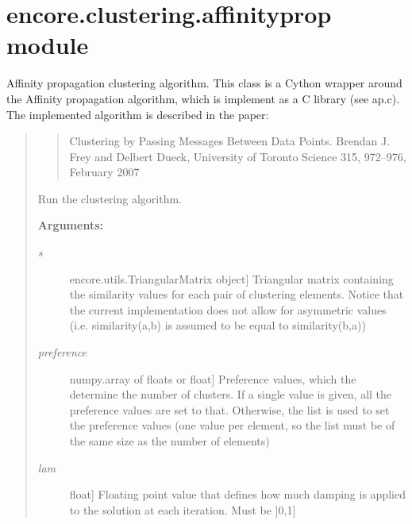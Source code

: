 \documentclass[letterpaper,10pt,english]{sphinxmanual}
\begin{document}
\section{encore.clustering.affinityprop module}
\label{index:encore-clustering-affinityprop-module}\label{index:module-encore.clustering.affinityprop}

\begin{fulllineitems}
Affinity propagation clustering algorithm. This class is a Cython wrapper around the Affinity propagation algorithm, which is implement as a C library (see ap.c). The implemented algorithm is described in the paper:
\begin{quote}
\begin{quote}

Clustering by Passing Messages Between Data Points.
Brendan J. Frey and Delbert Dueck, University of Toronto
Science 315, 972–976, February 2007
\end{quote}

\begin{fulllineitems}
\label{index:encore.clustering.affinityprop.run}
Run the clustering algorithm.

\textbf{Arguments:}
\begin{description}
\item[{\emph{s}}] \leavevmode{[}encore.utils.TriangularMatrix object{]}
Triangular matrix containing the similarity values for each pair of clustering elements. Notice that the current implementation does not allow for asymmetric values (i.e. similarity(a,b) is assumed to be equal to similarity(b,a))

\item[{\emph{preference}}] \leavevmode{[}numpy.array of floats or float{]}
Preference values, which the determine the number of clusters. If a single value is given, all the preference values are set to that. Otherwise, the list is used to set the preference values (one value per element, so the list must be of the same size as the number of elements)

\item[{\emph{lam}}] \leavevmode{[}float{]}
Floating point value that defines how much damping is applied to the solution at each iteration. Must be {]}0,1{]}


\end{description}
\end{fulllineitems}
\end{quote}
\end{fulllineitems}
\end{document}
